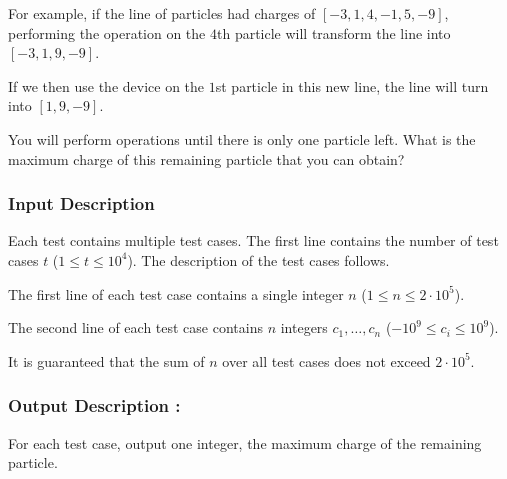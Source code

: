 \documentclass{article}
\begin{document}
For example, if the line of particles had charges of $[-3,1,4,-1,5,-9]$, performing the operation on the $4$th particle will transform the line into $[-3,1,9,-9]$.  

If we then use the device on the $1$st particle in this new line, the line will turn into $[1,9,-9]$. 

You will perform operations until there is only one particle left. What is the maximum charge of this remaining particle that you can obtain?
\paragraph{}
\subsubsection*{Input Description}Each test contains multiple test cases. The first line contains the number of test cases $t$ ($1 \le t \le 10^4$). The description of the test cases follows.

The first line of each test case contains a single integer $n$ ($1 \le n \le 2 \cdot 10^5$).

The second line of each test case contains $n$ integers $c_1,\dots,c_n$ ($-10^9 \le c_i \le 10^9$).

It is guaranteed that the sum of $n$ over all test cases does not exceed $2 \cdot 10^5$.
\paragraph{}
\subsubsection*{Output Description : }For each test case, output one integer, the maximum charge of the remaining particle.
\end{document}
